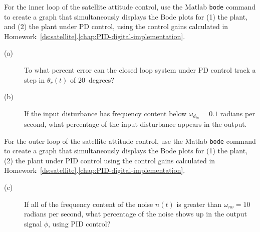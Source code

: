 
For the inner loop of the satellite attitude control, use the Matlab \texttt{bode} command to create a graph that simultaneously displays the Bode plots for (1) the plant, and (2) the plant under PD control, using the control gains calculated in Homework~\ref{ds:satellite}.\ref{chap:PID-digital-implementation}.  
\begin{description}
\item[(a)]  To what percent error can the closed loop system under PD control track a step in $\theta_r(t)$ of $20$~degrees? 
\item[(b)] If the input disturbance has frequency content below $\omega_{d_{in}}=0.1$ radians per second, what percentage of the input disturbance appears in the output.  
\end{description}

For the outer loop of the satellite attitude control, use the Matlab \texttt{bode} command to create a graph that simultaneously displays the Bode plots for (1) the plant, (2) the plant under PID control using the control gains calculated in Homework~\ref{ds:satellite}.\ref{chap:PID-digital-implementation}.  
\begin{description}
\item[(c)] If all of the frequency content of the noise $n(t)$ is greater than $\omega_{no} = 10$ radians per second, what percentage of the noise shows up in the output signal $\phi$, using PID control?
\end{description}
